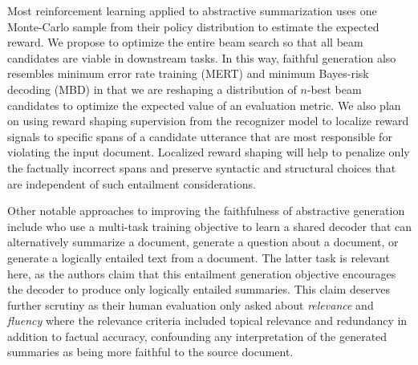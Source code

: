 Most reinforcement learning applied to abstractive summarization uses
one Monte-Carlo sample from their policy distribution to estimate the 
expected reward. We propose to optimize
the entire beam search so that all beam candidates are viable in downstream
tasks. In this way, faithful generation also resembles 
minimum error rate training (MERT) \cite{och2003minimum} 
and minimum Bayes-risk decoding (MBD)
\cite{kumar2004minimum} in that we are reshaping a distribution of $n$-best
beam candidates to optimize the expected value of an evaluation metric.
We also plan on using reward shaping supervision from the recognizer
model to localize reward signals \cite{mnih2014neural} to specific spans of 
a candidate utterance
that are most responsible for violating the input document. Localized
reward shaping will help to penalize only the factually incorrect spans
and preserve syntactic and structural choices that are independent of 
such entailment considerations.


Other notable approaches to improving the faithfulness of abstractive 
generation include \cite{guo2018soft} who use a multi-task training objective 
to learn a shared decoder that can alternatively summarize a document,
generate a question about a document, or generate a logically entailed text 
from a document.
The latter task is relevant here, as the authors claim that this entailment
generation objective encourages the decoder to produce only logically entailed
summaries. This claim deserves further scrutiny as their human 
evaluation only asked about \textit{relevance} and \textit{fluency} where
the relevance criteria included topical relevance and redundancy in addition
to factual accuracy, confounding any interpretation of the generated summaries
as being more faithful to the source document.







